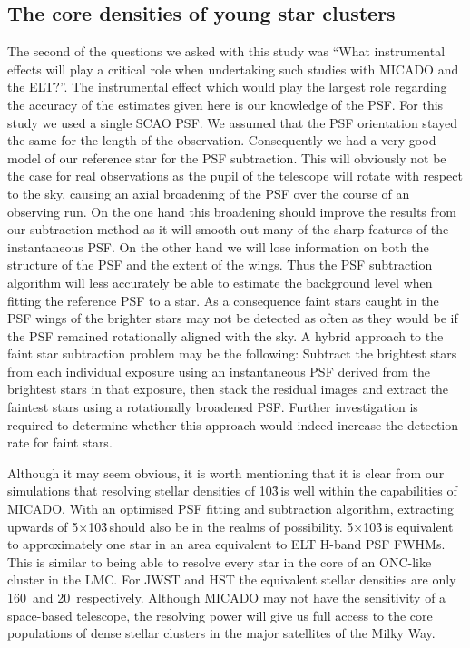 \subsection{The core densities of young star clusters}

The second of the questions we asked with this study was ``What instrumental
effects will play a critical role when undertaking such studies with MICADO and
the ELT?''. The instrumental effect which would play the largest role
regarding the accuracy of the estimates given here is our knowledge of the PSF.
For this study we used a single SCAO PSF. We assumed that the PSF orientation
stayed the same for the length of the observation. Consequently we had a very
good model of our reference star for the PSF subtraction. This will obviously
not be the case for real observations as the pupil of the telescope will rotate
with respect to the sky, causing an axial broadening of the PSF over the course
of an observing run. On the one hand this broadening should improve the results
from our subtraction method as it will smooth out many of the sharp features
of the instantaneous PSF. On the other hand we will lose information on both
the structure of the PSF and the extent of the wings. Thus the PSF subtraction
algorithm will less accurately be able to estimate the background level when
fitting the reference PSF to a star. As a consequence faint stars caught in the
PSF wings of the brighter stars may not be detected as often as they would be
if the PSF remained rotationally aligned with the sky. A hybrid approach to the
faint star subtraction problem may be the following: Subtract the brightest
stars from each individual exposure using an instantaneous PSF derived from the
brightest stars in that exposure, then stack the residual images and extract
the faintest stars using a rotationally broadened PSF. Further investigation is
required to determine whether this approach would indeed increase the detection
rate for faint stars.

Although it may seem obvious, it is worth mentioning that it is clear from our
simulations that resolving stellar densities of 10\h3\,\spa is well
within the capabilities of MICADO. With an optimised PSF fitting and
subtraction algorithm, extracting upwards of 5$\times$10\h3\,\spa should also
be in the realms of possibility. 5$\times$10\h3\,\spa is equivalent to
approximately one star in an area equivalent to  ELT H-band PSF
FWHMs.
This is similar to being able to resolve every star in the core of an ONC-like
cluster in the LMC. For JWST and HST the equivalent stellar densities are only
160~\spa and 20~\spa respectively. Although MICADO may not have the sensitivity
of a space-based telescope, the resolving power will give us full access to the
core populations of dense stellar clusters in the major satellites of the
Milky Way.


